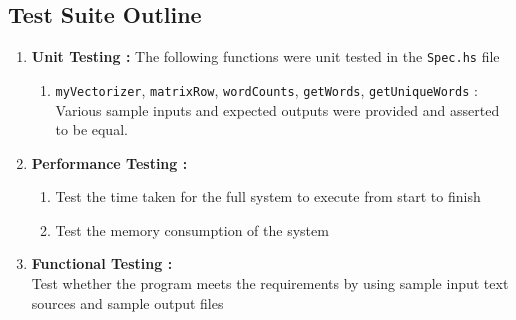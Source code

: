 \documentclass[12pt]{scrreprt}
\newcommand{\ttt}[1]{\texttt{#1}}
\begin{document}



\subsection{Test Suite Outline}

\begin{enumerate}
    \item \textbf{Unit Testing : } The following functions were unit tested in the \ttt{Spec.hs} file
    \begin{enumerate}
        \item \ttt{myVectorizer}, \ttt{matrixRow}, \ttt{wordCounts}, \ttt{getWords}, \ttt{getUniqueWords} : Various sample inputs and expected outputs were provided and asserted to be equal. 

    \end{enumerate}

    \item \textbf{Performance Testing : } 
    \begin{enumerate}
        \item Test the time taken for the full system to execute from start to finish
        \item Test the memory consumption of the system
    \end{enumerate}
    \item \textbf{Functional Testing : } \\ Test whether the program meets the requirements by using sample input text sources and sample output files
\end{enumerate}








\end{document}
